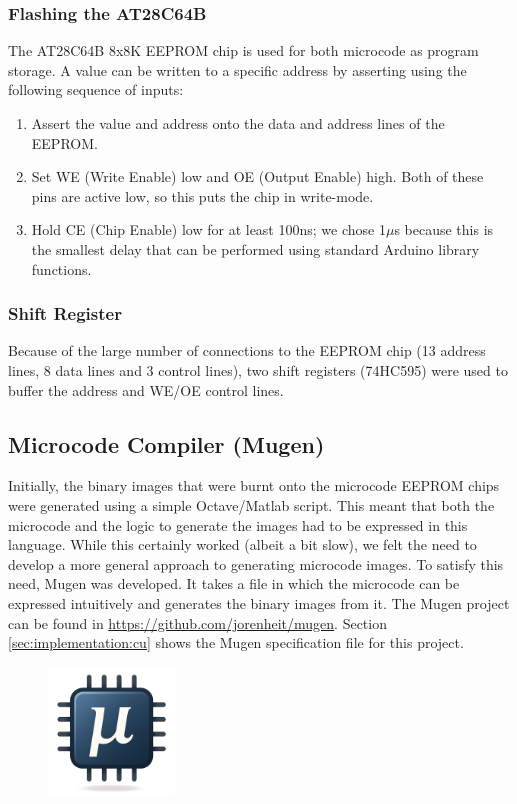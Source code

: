 \subsubsection{Flashing the AT28C64B}
The AT28C64B 8x8K EEPROM chip is used for both microcode as program storage. A value can be written to a specific address by asserting  using the following sequence of inputs:
\begin{enumerate}
\item Assert the value and address onto the data and address lines of the EEPROM.
\item Set WE (Write Enable) low and OE (Output Enable) high. Both of these pins are active low, so this puts the chip in write-mode.
\item Hold CE (Chip Enable) low for at least 100ns; we chose 1$\mu$s because this is the smallest delay that can be performed using standard Arduino library functions.
\end{enumerate}

\subsubsection{Shift Register}
Because of the large number of connections to the EEPROM chip (13 address lines, 8 data lines and 3 control lines), two shift registers (74HC595) were used to buffer the address and WE/OE control lines.


\subsection{Microcode Compiler (Mugen)} \label{sec:utilities:mugen}
Initially, the binary images that were burnt onto the microcode EEPROM chips were generated using a simple Octave/Matlab script. This meant that both the microcode and the logic to generate the images had to be expressed in this language. While this certainly worked (albeit a bit slow), we felt the need to develop a more general approach to generating microcode images. To satisfy this need, Mugen was developed. It takes a file in which the microcode can be expressed intuitively and generates the binary images from it. The Mugen project can be found in \url{https://github.com/jorenheit/mugen}. Section \ref{sec:implementation:cu} shows the Mugen specification file for this project. 

\begin{figure}[H]
  \centering
  \includegraphics[width=0.3\textwidth]{img/mugen_logo}
\end{figure}

